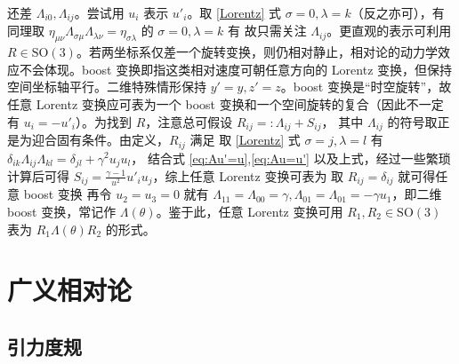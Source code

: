    还差 $\Lambda_{i0},\Lambda_{ij}$。尝试用 $u_i$ 表示 $u'_i$。取 \eqref{Lorentz} 式 $\sigma=0,\lambda=k$（反之亦可），有
    同理取 $\eta_{\mu\nu}\Lambda_{\sigma\mu}\Lambda_{\lambda\nu}={\eta}_{\sigma\lambda}$ 的 $\sigma=0,\lambda=k$ 有
    故只需关注 $\Lambda_{ij}$。更直观的表示可利用 $R\in\mathrm{SO}(3)$。若两坐标系仅差一个旋转变换，则仍相对静止，相对论的动力学效应不会体现。boost 变换即指这类相对速度可朝任意方向的 Lorentz 变换，但保持空间坐标轴平行。二维特殊情形保持 $y'=y,z'=z$。boost 变换是“时空旋转”，故任意 Lorentz 变换应可表为一个 boost 变换和一个空间旋转的复合（因此不一定有 $u_i=-u'_i$）。为找到 $R$，注意总可假设
    $R_{ij}=:\Lambda_{ij}+S_{ij}$，
    其中 $\Lambda_{ij}$ 的符号取正是为迎合固有条件。由定义，$R_{ij}$ 满足
    取 \eqref{Lorentz} 式 $\sigma=j,\lambda=l$ 有 $\delta_{ik}\Lambda_{ij}\Lambda_{kl}=\delta_{jl}+ \gamma^2 u_j u_l$，
    结合式 \eqref{eq:Au'=u},\eqref{eq:Au=u'} 以及上式，经过一些繁琐计算后可得 $S_{ij}=\frac{\gamma-1}{u^2}u'_i u_j$，综上任意 Lorentz 变换可表为
    取 $R_{ij}=\delta_{ij}$ 就可得任意 boost 变换
再令 $u_2=u_3=0$ 就有 $\Lambda_{11}=\Lambda_{00}=\gamma, \Lambda_{01}=\Lambda_{01}=-\gamma u_1$，即二维 boost 变换，常记作 $\Lambda(\theta)$。鉴于此，任意 Lorentz 变换可用 $R_{1},R_{2}\in\mathrm{SO}(3)$ 表为 $R_{1} \Lambda(\theta) R_{2}$ 的形式。

\section{广义相对论}
\subsection{引力度规}

